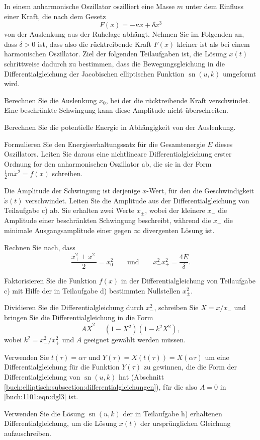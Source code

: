 In einem anharmonische Oszillator oszilliert eine Masse $m$ unter dem
Einfluss einer Kraft, die nach dem Gesetz
\[
F(x) = -\kappa x + \delta x^3
\]
von der Auslenkung aus der Ruhelage abhängt.
Nehmen Sie im Folgenden an, dass $\delta >0$ ist,
dass also die rücktreibende Kraft $F(x)$ kleiner ist als bei einem
harmonischen Oszillator.
Ziel der folgenden Teilaufgaben ist, die Lösung $x(t)$ schrittweise
dadurch zu bestimmen, dass die Bewegungsgleichung in die Differentialgleichung
der Jacobischen elliptischen Funktion $\operatorname{sn}(u,k)$ umgeformt
wird.
\begin{teilaufgaben}
\item
Berechnen Sie die Auslenkung $x_0$, bei der die rücktreibende Kraft
verschwindet.
Eine beschränkte Schwingung kann diese Amplitude nicht überschreiten.
\item
Berechnen Sie die potentielle Energie in Abhängigkeit von der 
Auslenkung.
\item
\label{buch:1101:basic-dgl}
Formulieren Sie den Energieerhaltungssatz für die Gesamtenergie $E$
dieses Oszillators.
Leiten Sie daraus eine nichtlineare Differentialgleichung erster Ordnung
for den anharmonischen Oszillator ab, die sie in der Form
$\frac12m\dot{x}^2 = f(x)$ schreiben.
\item
Die Amplitude der Schwingung ist derjenige $x$-Wert, für den die
Geschwindigkeit $\dot{x}(t)$ verschwindet.
Leiten Sie die Amplitude aus der Differentialgleichung von
Teilaufgabe c)
ab.
Sie erhalten zwei Werte $x_{\pm}$, wobei der kleinere $x_-$
die Amplitude einer beschränkten Schwingung beschreibt,
während die $x_+$ die minimale Ausgangsamplitude einer gegen
$\infty$ divergenten Lösung ist.
\item
Rechnen Sie nach, dass
\[
\frac{x_+^2+x_-^2}{2}
=
x_0^2
\qquad\text{und}\qquad
x_-^2x_+^2
=
\frac{4E}{\delta}.
\]
\item
Faktorisieren Sie die Funktion $f(x)$ in der Differentialgleichung
von Teilaufgabe c) mit Hilfe der in Teilaufgabe d) bestimmten 
Nullstellen $x_{\pm}^2$.
\item
Dividieren Sie die Differentialgleichung durch $x_-^2$, schreiben
Sie $X=x/x_-$ und bringen Sie die Differentialgleichung in die
Form
\begin{equation}
A \dot{X}^2
=
(1-X^2)
(1-k^2X^2),
\label{buch:1101:eqn:dgl3}
\end{equation}
wobei $k^2=x_-^2/x_+^2$ und $A$ geeignet gewählt werden müssen.
\item
\label{buch:1101:teilaufgabe:dgl3}
Verwenden Sie $t(\tau) = \alpha\tau$
und
$Y(\tau)=X(t(\tau))=X(\alpha\tau)$ um eine Differentialgleichung für
die Funktion $Y(\tau)$ zu gewinnen, die die Form der Differentialgleichung
von $\operatorname{sn}(u,k)$ hat (Abschnitt 
\ref{buch:elliptisch:subsection:differentialgleichungen}),
für die also $A=0$ in \eqref{buch:1101:eqn:dgl3} ist.
\item
Verwenden Sie die Lösung $\operatorname{sn}(u,k)$ der in 
Teilaufgabe h)
erhaltenen Differentialgleichung,
um die Lösung $x(t)$ der ursprünglichen Gleichung aufzuschreiben.
\end{teilaufgaben}


